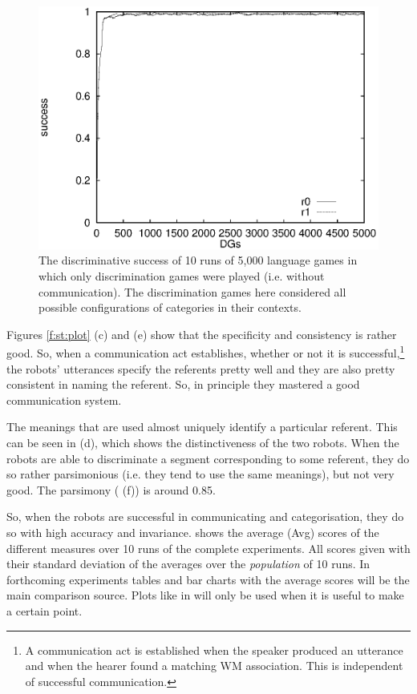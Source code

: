 \begin{figure}[t]
\centerline{\includegraphics[width=12cm]{basic/dsall.eps}}
\caption{The discriminative success of 10 runs of 5,000 language games in which only discrimination games were played (i.e. without communication). The discrimination games here considered all possible configurations of categories in their contexts.}
\label{f:st:ds}
\end{figure}

Figures \ref{f:st:plot} (c) and (e) show that the specificity and consistency is rather good. So, when a communication act establishes, whether or not it is successful,\footnote{A communication act is established when the speaker produced an utterance and when the hearer found a matching WM association. This is independent of successful communication.} the robots' utterances specify the referents pretty well and they are also pretty consistent in naming the referent. So, in principle they mastered a good communication system.

The meanings that are used almost uniquely identify a particular referent. This can be seen in  (d), which shows the distinctiveness of the two robots. When the robots are able to discriminate a segment corresponding to some referent, they do so rather parsimonious (i.e. they tend to use the same meanings), but not very good. The parsimony ( (f)) is around 0.85. 

So, when the robots are successful in communicating and categorisation, they do so with high accuracy and invariance.  shows the average (Avg) scores of the different measures over 10 runs of the complete experiments. All scores given with their standard deviation of the averages over the {\em population} of 10 runs. In forthcoming experiments tables and bar charts with the average scores will be the main comparison source. Plots like in  will only be used when it is useful to make a certain point.

